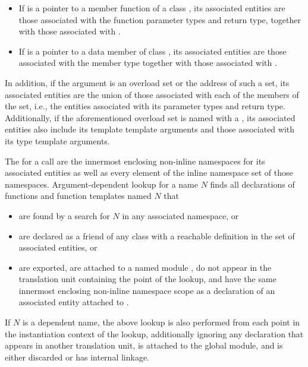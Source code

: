 \begin{itemize}
\item If  is a pointer to a member function of a class
, its associated entities are those associated
with the function parameter types and return type, together with those
associated with .

\item If  is a pointer to a data member of class , its
associated entities are those associated with the member
type together with those associated with .
\end{itemize}
In addition, if the argument is an overload set or the address of such a set,
its associated entities
are the union of those associated with each of the
members of the set, i.e., the entities associated with its
parameter types and return type.
Additionally, if the aforementioned overload set is named with
a , its associated entities also include
its template template arguments and
those associated with its type template arguments.

\pnum
The  for a call are
the innermost enclosing non-inline namespaces for its associated entities
as well as every element of the inline namespace set
of those namespaces.
Argument-dependent lookup for a name $N$ finds
all declarations of functions and function templates named $N$ that
\begin{itemize}
\item
are found by a search for $N$ in any associated namespace, or
\item
are declared as a friend of any class
with a reachable definition in the set of associated entities, or
\item
are exported,
are attached to a named module ,
do not appear in the translation unit containing the point of the lookup, and
have the same innermost enclosing non-inline namespace scope as
a declaration of an associated entity attached to .
\end{itemize}
If $N$ is a dependent name,
the above lookup is also performed
from each point in the instantiation context of the lookup,
additionally ignoring any declaration that
appears in another translation unit,
is attached to the global module, and
is either discarded or has internal linkage.

